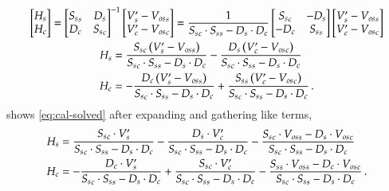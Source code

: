\begin{gather}
    \begin{bmatrix}
        H_s\\
        H_c\\
    \end{bmatrix} =
    \begin{bmatrix}
        {S_s}_s & D_s \\
        D_c & {S_s}_c \\
    \end{bmatrix} ^{-1}
    \begin{bmatrix}
        V'_s - {V_{os}}_s\\
        V'_c - {V_{os}}_c\\
    \end{bmatrix}
    =
    \frac{1}{{S_s}_c \cdot {S_s}_s - D_s \cdot D_c}
    \begin{bmatrix}
        {S_s}_c & -D_s \\
        -D_c & {S_s}_s \\
    \end{bmatrix}
    \begin{bmatrix}
        V'_s - {V_{os}}_s\\
        V'_c - {V_{os}}_c\\
    \end{bmatrix}\\
    \begin{aligned}
        H_s & = \frac{{S_s}_c \left( V'_s - {V_{os}}_s \right)}{{S_s}_c \cdot {S_s}_s - D_s \cdot D_c} - \frac{D_s \left( V'_c - {V_{os}}_c \right)}{{S_s}_c \cdot {S_s}_s - D_s \cdot D_c}\\
        H_c & = - \frac{D_c \left( V'_s - {V_{os}}_s \right)}{{S_s}_c \cdot {S_s}_s - D_s \cdot D_c} + \frac{{S_s}_s \left( V'_c - {V_{os}}_c \right)}{{S_s}_c \cdot {S_s}_s - D_s \cdot D_c} \,.
    \end{aligned}
    \label{eq:cal-solved}
\end{gather}
 shows \cref{eq:cal-solved} after expanding and gathering like terms,
\begin{equation}
    \begin{aligned}
        H_s & = \frac{{S_s}_c \cdot V'_s }{{S_s}_c \cdot {S_s}_s - D_s \cdot D_c} - \frac{D_s \cdot  V'_c }{{S_s}_c \cdot {S_s}_s - D_s \cdot D_c} - \frac{{S_s}_c \cdot {V_{os}}_s  -D_s \cdot {V_{os}}_c}{{S_s}_c \cdot {S_s}_s - D_s \cdot D_c}\\
        H_c & = - \frac{D_c \cdot V'_s }{{S_s}_c \cdot {S_s}_s - D_s \cdot D_c} + \frac{{S_s}_c \cdot  V'_c }{{S_s}_c \cdot {S_s}_s - D_s \cdot D_c} - \frac{{S_s}_s \cdot {V_{os}}_s  -D_c \cdot {V_{os}}_c}{{S_s}_c \cdot {S_s}_s - D_s \cdot D_c} \,.
    \end{aligned}
    \label{eq:cal-expanded}
\end{equation}
